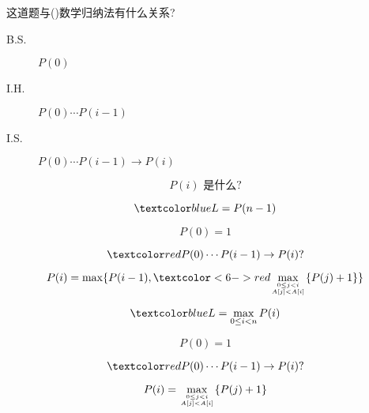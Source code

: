 \begin{frame}{}
  \centerline{ 这道题与()数学归纳法有什么关系?}

  \vspace{0.30cm}
  \pause
  \begin{description}
    \item[B.S.] $P(0)$
    \item[I.H.] $P(0) \cdots P(i-1)$
    \item[I.S.] $P(0) \cdots P(i-1) \to P(i)$
  \end{description}

  \pause
  \[
    P(i) \text{ 是什么?}
  \]
\end{frame}

\begin{frame}{}
  \centerline{}

  \pause
  \[
    \blue{L = P(n-1)}
  \]

  \pause
  \[
    P(0) = 1
  \]

  \pause
  \[
    \red{P(0) \cdots P(i-1) \to P(i)?}
  \]

  \pause
  \[
    P(i) = \max\set{P(i-1), \redoverlay{\max_{0 \le j < i \atop A[j] < A[i]} \set{P(j) + 1}}{6-}}
  \]
  
\end{frame}

\begin{frame}{}
  \centerline{}

  \pause
  \[
    \blue{L = \max_{0 \le i < n} P(i)}
  \]

  \pause
  \[
    P(0) = 1
  \]

  \pause
  \[
    \red{P(0) \cdots P(i-1) \to P(i)?}
  \]

  \pause
  \[
    P(i) = \max_{0 \le j < i \atop A[j] < A[i]} \{P(j) + 1\}
  \]
\end{frame}

